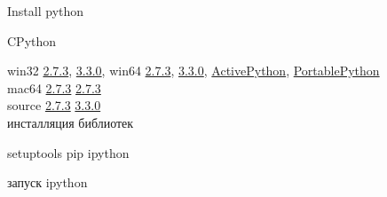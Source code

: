 \documentclass[12pt]{article}
\begin{document}
\begin{center}Install python\end{center}
\begin{center}CPython\end{center}
  win32 
  \href{http://www.python.org/ftp/python/2.7.3/python-2.7.3.msi}{2.7.3},
  \href{http://www.python.org/ftp/python/3.3.0/python-3.3.0.msi}{3.3.0},
  win64 
  \href{http://www.python.org/ftp/python/2.7.3/python-2.7.3.amd64.msi}{2.7.3},
  \href{http://www.python.org/ftp/python/3.3.0/python-3.3.0.amd64.msi}{3.3.0},
  \href{http://www.activestate.com/activepython/}{ActivePython},
  \href{http://portablepython.com/}{PortablePython}\\
  mac64
  \href{http://www.python.org/ftp/python/2.7.3/python-2.7.3-macosx10.6.dmg}{2.7.3}
  \href{http://www.python.org/ftp/python/3.3.0/python-3.3.0-macosx10.6.dmg}{2.7.3} \\
  source
  \href{http://www.python.org/ftp/python/2.7.3/Python-2.7.3.tar.bz2}{2.7.3}
  \href{http://www.python.org/ftp/python/3.3.0/Python-3.3.0.tar.bz2}{3.3.0} \\

  инсталляция библиотек
  
  setuptools
  pip
  ipython

  запуск ipython
  
\end{document}
